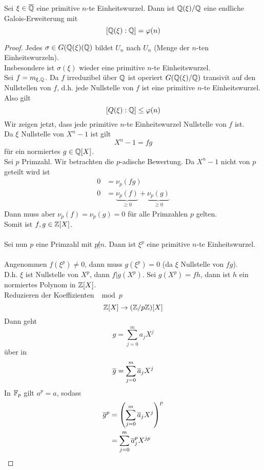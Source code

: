 	\begin{theorem}
		Sei $\xi\in\overline{\mathbb{Q}}$ eine primitive $n$-te Einheitswurzel. Dann ist $\mathbb{Q}(\xi)/\mathbb{Q}$ eine endliche Galois-Erweiterung mit 
		\[[\mathbb{Q}(\xi):\mathbb{Q}]=\varphi(n)\]
	\end{theorem}
	\begin{proof}
		Jedes $\sigma\in G(\mathbb{Q}(\xi)(\mathbb{Q})$ bildet $U_n$ nach $U_n$ (Menge der $n$-ten Einheitswurzeln).\\
		Insbesondere ist $\sigma(\xi)$ wieder eine primitive $n$-te Einheitswurzel. \\
		Sei $f=m_{\xi,\mathbb{Q}}$. Da $f$  irreduzibel über $\mathbb{Q}$ ist operiert $G(\mathbb{Q}(\xi)/\mathbb{Q})$ transivit auf den Nullstellen von $f$, d.h. jede Nullstelle von $f$ ist eine primitive $n$-te Einheitswurzel.\\
		Also gilt
		\[[Q(\xi):\mathbb{Q}]\leq\varphi(n)\]
		Wir zeigen jetzt, dass jede primitive $n$-te Einheitswurzel Nullstelle von $f$ ist.\\
		Da $\xi$ Nullstelle von $X^n-1$ ist gilt
		\[X^n-1=fg\]
		für ein normiertes $g\in\mathbb{Q}[X]$.\\
		Sei $p$ Primzahl. Wir betrachten die $p$-adische Bewertung. Da $X^n-1$ nicht von $p$ geteilt wird ist  %
		\begin{align*}
		0&=\nu_p(fg)\\
		0&=\underbrace{\nu_p(f)}_{\geq 0}+\underbrace{\nu_p(g)}_{\geq 0}
		\end{align*}
		Dann muss aber $\nu_p(f)=\nu_p(g)=0$ für alle Primzahlen $p$ gelten.\\
		Somit ist $f,g\in\mathbb{Z}[X]$.\\
		\\
		Sei nun $p$ eine Primzahl mit $p\not|n$. Dann ist $\xi^p$ eine primitive $n$-te Einheitswurzel.\\
		\\
		Angenommen $f(\xi^p)\neq0$, dann muss $g(\xi^p)=0$ (da $\xi$ Nullstelle von $fg$).\\
		D.h. $\xi$ ist Nullstelle von $X^p$, dann $f|g(X^p)$. Sei $g(X^p)=fh$, dann ist $h$ ein normiertes Polynom in $\mathbb{Z}[X]$.\\
		Reduzieren der Koeffizienten $\mod p$ 
		\[\mathbb{Z}[X]\to(\mathbb{Z}/p\mathbb{Z})[X]\]
		Dann geht
		\[g=\sum_{j=0}^{m}a_jX^j\]
		über in
		\[\overline{g}=\sum_{j=0}^{m}\overline{a}_jX^j\]
		In $\mathbb{F}_p$ gilt $a^p=a$, sodass
		\begin{align*}
		\ol g^p&=\left(\sum_{j=0}^{m}\ol a_jX^j\right)^p\\
		&=\sum_{j=0}^{m}\ol a_j^pX^{jp}\\

\end{align*}
\end{proof}
